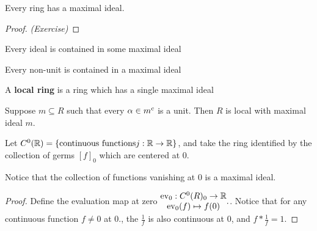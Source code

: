 \documentclass[12pt, twosided]{article}
\begin{document}
\begin{prop}
  Every ring has a maximal ideal.
\end{prop}
\begin{proof}
  {\color{red} \textit{(Exercise)}}
\end{proof}

\begin{cor}
  Every ideal is contained in some maximal ideal
\end{cor}

\begin{cor}
  Every non-unit is contained in a maximal ideal
\end{cor}

\begin{df}
  A \textbf{local ring} is a ring which has a single maximal ideal
\end{df}

\begin{prop}
  Suppose \(m \subseteq R\) such that every \(\alpha \in m^c\) is a unit. Then \(R\) is local with maximal ideal \(m\).
\end{prop}

\begin{exa}
  Let \(C^0(\mathbb{R}) = \left\{  \text{continuous functions} j: \mathbb{R} \to \mathbb{R} \right\}\), and take the ring identified by the collection of germs \([f]_0\) which are centered at \(0\).

  Notice that the collection of functions vanishing at \(0\) is a maximal ideal.
\end{exa}
\begin{proof}
  Define the evaluation map at zero \(
  \begin{matrix}
    \mathrm{ev}_0: C^0(R)_0 \to \mathbb{R} \\
    \mathrm{ev}_0(f) \mapsto f(0)
  \end{matrix}.
  \). Notice that for any continuous function \(f \neq 0\) at \(0\)., the \(\frac{1}{f}\) is also continuous at \(0\), and \(f * \frac{1}{f} = 1\).
\end{proof}
\end{document}
